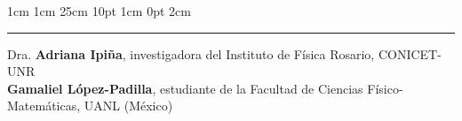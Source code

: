 \documentclass[12pt,letterpaper]{article}
\begin{document}
\setmargins{2cm}
{1cm}
{1cm}
{25cm}
{10pt}
{1cm}
{0pt}
{2cm}




\hrule
\small \vspace{0.25cm}
Dra. \textbf{Adriana Ipiña}, investigadora del Instituto de Física Rosario, CONICET-UNR\\

\textbf{Gamaliel López-Padilla}, estudiante de la Facultad de Ciencias Físico-Matemáticas, UANL (México)
\end{document}
